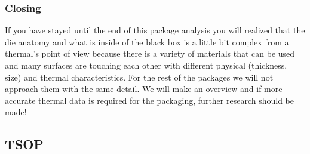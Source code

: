 \documentclass[final]{cubedoc}
\begin{document}
	
	
	\subsubsection{Closing}
	
	
	If you have stayed until the end of this package analysis you will realized that the die anatomy and what is inside of the black box is a little bit complex from a thermal's point of view because there is a variety of materials that can be used and many surfaces are touching each other with different physical (thickness, size) and thermal characteristics. For the rest of the packages we will not approach them with the same detail. We will make an overview and if more accurate thermal data is required for the packaging, further research should be made!
	
	
	
	
	
	\subsection{TSOP}
	
	
	
\end{document}
